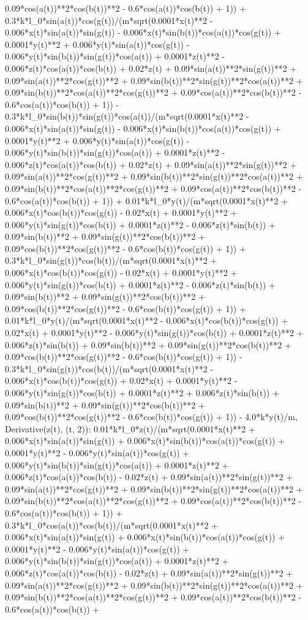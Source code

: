 0.09*cos(a(t))**2*cos(b(t))**2 - 0.6*cos(a(t))*cos(b(t)) + 1)) + 0.3*k*l_0*sin(a(t))*cos(g(t))/(m*sqrt(0.0001*x(t)**2 - 0.006*x(t)*sin(a(t))*sin(g(t)) - 0.006*x(t)*sin(b(t))*cos(a(t))*cos(g(t)) + 0.0001*y(t)**2 + 0.006*y(t)*sin(a(t))*cos(g(t)) - 0.006*y(t)*sin(b(t))*sin(g(t))*cos(a(t)) + 0.0001*z(t)**2 - 0.006*z(t)*cos(a(t))*cos(b(t)) + 0.02*z(t) + 0.09*sin(a(t))**2*sin(g(t))**2 + 0.09*sin(a(t))**2*cos(g(t))**2 + 0.09*sin(b(t))**2*sin(g(t))**2*cos(a(t))**2 + 0.09*sin(b(t))**2*cos(a(t))**2*cos(g(t))**2 + 0.09*cos(a(t))**2*cos(b(t))**2 - 0.6*cos(a(t))*cos(b(t)) + 1)) - 0.3*k*l_0*sin(b(t))*sin(g(t))*cos(a(t))/(m*sqrt(0.0001*x(t)**2 - 0.006*x(t)*sin(a(t))*sin(g(t)) - 0.006*x(t)*sin(b(t))*cos(a(t))*cos(g(t)) + 0.0001*y(t)**2 + 0.006*y(t)*sin(a(t))*cos(g(t)) - 0.006*y(t)*sin(b(t))*sin(g(t))*cos(a(t)) + 0.0001*z(t)**2 - 0.006*z(t)*cos(a(t))*cos(b(t)) + 0.02*z(t) + 0.09*sin(a(t))**2*sin(g(t))**2 + 0.09*sin(a(t))**2*cos(g(t))**2 + 0.09*sin(b(t))**2*sin(g(t))**2*cos(a(t))**2 + 0.09*sin(b(t))**2*cos(a(t))**2*cos(g(t))**2 + 0.09*cos(a(t))**2*cos(b(t))**2 - 0.6*cos(a(t))*cos(b(t)) + 1)) + 0.01*k*l_0*y(t)/(m*sqrt(0.0001*x(t)**2 + 0.006*x(t)*cos(b(t))*cos(g(t)) - 0.02*x(t) + 0.0001*y(t)**2 + 0.006*y(t)*sin(g(t))*cos(b(t)) + 0.0001*z(t)**2 - 0.006*z(t)*sin(b(t)) + 0.09*sin(b(t))**2 + 0.09*sin(g(t))**2*cos(b(t))**2 + 0.09*cos(b(t))**2*cos(g(t))**2 - 0.6*cos(b(t))*cos(g(t)) + 1)) + 0.3*k*l_0*sin(g(t))*cos(b(t))/(m*sqrt(0.0001*x(t)**2 + 0.006*x(t)*cos(b(t))*cos(g(t)) - 0.02*x(t) + 0.0001*y(t)**2 + 0.006*y(t)*sin(g(t))*cos(b(t)) + 0.0001*z(t)**2 - 0.006*z(t)*sin(b(t)) + 0.09*sin(b(t))**2 + 0.09*sin(g(t))**2*cos(b(t))**2 + 0.09*cos(b(t))**2*cos(g(t))**2 - 0.6*cos(b(t))*cos(g(t)) + 1)) + 0.01*k*l_0*y(t)/(m*sqrt(0.0001*x(t)**2 - 0.006*x(t)*cos(b(t))*cos(g(t)) + 0.02*x(t) + 0.0001*y(t)**2 - 0.006*y(t)*sin(g(t))*cos(b(t)) + 0.0001*z(t)**2 + 0.006*z(t)*sin(b(t)) + 0.09*sin(b(t))**2 + 0.09*sin(g(t))**2*cos(b(t))**2 + 0.09*cos(b(t))**2*cos(g(t))**2 - 0.6*cos(b(t))*cos(g(t)) + 1)) - 0.3*k*l_0*sin(g(t))*cos(b(t))/(m*sqrt(0.0001*x(t)**2 - 0.006*x(t)*cos(b(t))*cos(g(t)) + 0.02*x(t) + 0.0001*y(t)**2 - 0.006*y(t)*sin(g(t))*cos(b(t)) + 0.0001*z(t)**2 + 0.006*z(t)*sin(b(t)) + 0.09*sin(b(t))**2 + 0.09*sin(g(t))**2*cos(b(t))**2 + 0.09*cos(b(t))**2*cos(g(t))**2 - 0.6*cos(b(t))*cos(g(t)) + 1)) - 4.0*k*y(t)/m, Derivative(z(t), (t, 2)): 0.01*k*l_0*z(t)/(m*sqrt(0.0001*x(t)**2 + 0.006*x(t)*sin(a(t))*sin(g(t)) + 0.006*x(t)*sin(b(t))*cos(a(t))*cos(g(t)) + 0.0001*y(t)**2 - 0.006*y(t)*sin(a(t))*cos(g(t)) + 0.006*y(t)*sin(b(t))*sin(g(t))*cos(a(t)) + 0.0001*z(t)**2 + 0.006*z(t)*cos(a(t))*cos(b(t)) - 0.02*z(t) + 0.09*sin(a(t))**2*sin(g(t))**2 + 0.09*sin(a(t))**2*cos(g(t))**2 + 0.09*sin(b(t))**2*sin(g(t))**2*cos(a(t))**2 + 0.09*sin(b(t))**2*cos(a(t))**2*cos(g(t))**2 + 0.09*cos(a(t))**2*cos(b(t))**2 - 0.6*cos(a(t))*cos(b(t)) + 1)) + 0.3*k*l_0*cos(a(t))*cos(b(t))/(m*sqrt(0.0001*x(t)**2 + 0.006*x(t)*sin(a(t))*sin(g(t)) + 0.006*x(t)*sin(b(t))*cos(a(t))*cos(g(t)) + 0.0001*y(t)**2 - 0.006*y(t)*sin(a(t))*cos(g(t)) + 0.006*y(t)*sin(b(t))*sin(g(t))*cos(a(t)) + 0.0001*z(t)**2 + 0.006*z(t)*cos(a(t))*cos(b(t)) - 0.02*z(t) + 0.09*sin(a(t))**2*sin(g(t))**2 + 0.09*sin(a(t))**2*cos(g(t))**2 + 0.09*sin(b(t))**2*sin(g(t))**2*cos(a(t))**2 + 0.09*sin(b(t))**2*cos(a(t))**2*cos(g(t))**2 + 0.09*cos(a(t))**2*cos(b(t))**2 - 0.6*cos(a(t))*cos(b(t)) + 